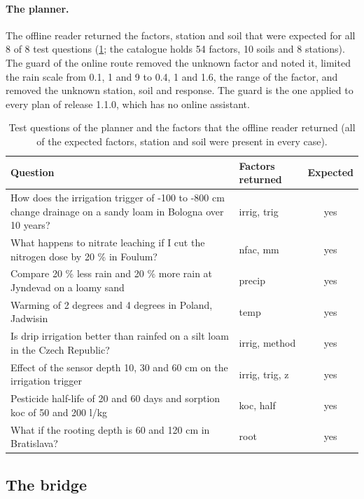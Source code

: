 \paragraph{The planner.}
The offline reader returned the factors, station and soil that were expected for all 8 of 8 test questions (\cref{tab:planner}; the catalogue holds 54 factors, 10 soils and 8 stations). The guard of the online route removed the unknown factor and noted it, limited the rain scale from 0.1, 1 and 9 to 0.4, 1 and 1.6, the range of the factor, and removed the unknown station, soil and response. The guard is the one applied to every plan of release 1.1.0, which has no online assistant.
\begin{table}[H]\centering\small
\caption{Test questions of the planner and the factors that the offline reader returned (all of the expected factors, station and soil were present in every case).}\label{tab:planner}
\begin{tabularx}{\textwidth}{Xlc}\toprule Question & Factors returned & Expected\\\midrule
How does the irrigation trigger of -100 to -800 cm change drainage on a sandy loam in Bologna over 10 years? & irrig, trig & yes\\
What happens to nitrate leaching if I cut the nitrogen dose by 20 \% in Foulum? & nfac, mm & yes\\
Compare 20 \% less rain and 20 \% more rain at Jyndevad on a loamy sand & precip & yes\\
Warming of 2 degrees and 4 degrees in Poland, Jadwisin & temp & yes\\
Is drip irrigation better than rainfed on a silt loam in the Czech Republic? & irrig, method & yes\\
Effect of the sensor depth 10, 30 and 60 cm on the irrigation trigger & irrig, trig, z & yes\\
Pesticide half-life of 20 and 60 days and sorption koc of 50 and 200 l/kg & koc, half & yes\\
What if the rooting depth is 60 and 120 cm in Bratislava? & root & yes\\
\bottomrule\end{tabularx}\end{table}


\subsection{The bridge}
